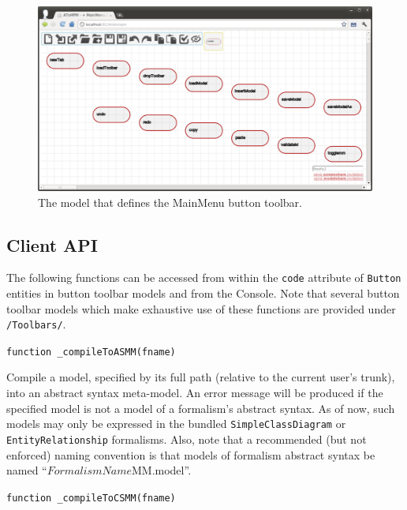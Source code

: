 \documentclass{article}
\numberwithin{equation}{section}
\numberwithin{figure}{section}
\begin{document}
\begin{figure}[h]
	\centering
	\includegraphics[scale=0.4]{figures/mainmenum}
	\caption{The model that defines the MainMenu button toolbar.}
	\label{fig:mainmenum}
\end{figure}



\subsection{Client API}
The following functions can be accessed from within the \texttt{code} attribute of \texttt{Button} entities in button toolbar models and from the Console. Note that several button toolbar models which make exhaustive use of these functions are provided under \texttt{/Toolbars/}.

\begin{center}	{\large \texttt{function \_compileToASMM(fname)}} \end{center}

Compile a model, specified by its full path (relative to the current user's trunk), into an abstract syntax meta-model. An error message will be produced if the specified model is not a model of a formalism's abstract syntax. As of now, such models may only be expressed in the bundled \texttt{SimpleClassDiagram} or \texttt{EntityRelationship} formalisms. Also, note that a recommended (but not enforced) naming convention is that models of formalism abstract syntax be named ``$FormalismName$MM.model''.\\
\vspace*{1em}


\begin{center}	{\large \texttt{function \_compileToCSMM(fname)}} \end{center}
\end{document}
